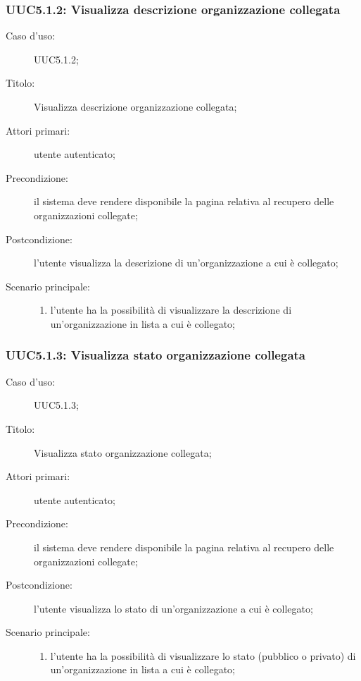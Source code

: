 \documentclass[../../../analisi-dei-requisiti.tex]{subfiles}
\begin{document}
\subsubsection{UUC5.1.2: Visualizza descrizione organizzazione collegata}%
\label{subs:UUC5.1.2}
\begin{description}
  \item[Caso d’uso:] UUC5.1.2;
  \item[Titolo:] Visualizza descrizione organizzazione collegata;
  \item[Attori primari:] utente autenticato;
  \item[Precondizione:] il sistema deve rendere disponibile la pagina relativa al recupero delle organizzazioni collegate;
  \item[Postcondizione:] l'utente visualizza la descrizione di un'organizzazione a cui è collegato;
  \item[Scenario principale:]
        \begin{enumerate}
          \item l'utente ha la possibilità di visualizzare la descrizione di un'organizzazione in lista a cui è collegato;
        \end{enumerate}
\end{description}

\subsubsection{UUC5.1.3: Visualizza stato organizzazione collegata}%
\label{subs:UUC5.1.3}
\begin{description}
  \item[Caso d’uso:] UUC5.1.3;
  \item[Titolo:] Visualizza stato organizzazione collegata;
  \item[Attori primari:] utente autenticato;
  \item[Precondizione:] il sistema deve rendere disponibile la pagina relativa al recupero delle organizzazioni collegate;
  \item[Postcondizione:] l'utente visualizza lo stato di un'organizzazione a cui è collegato;
  \item[Scenario principale:]
        \begin{enumerate}
          \item l'utente ha la possibilità di visualizzare lo stato (pubblico o privato) di un'organizzazione in lista a cui è collegato;
        \end{enumerate}
\end{description}
\end{document}
